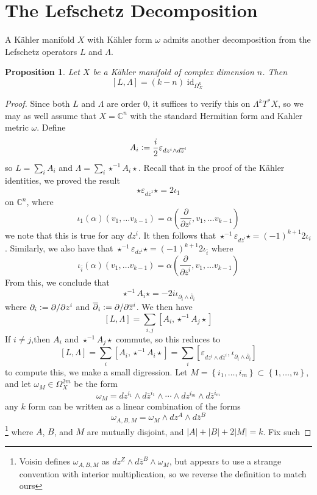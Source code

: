 \documentclass[psamsfonts, 12pt]{amsart}
\newtheorem{prop}[thm]{Proposition}
\theoremstyle{definition}
\theoremstyle{remark}
\newcommand{\C}{\mathbb{C}}
\newcommand{\dbar}{\overline{\partial}}
\newcommand{\zbar}{\overline{z}}
\newcommand{\inv}{^{-1}}
\newcommand{\set}[1]{\left\lbrace #1 \right\rbrace}
\newcommand{\defeq}{\vcentcolon=}
\DeclareMathOperator{\id}{id}
\begin{document}
\section{The Lefschetz Decomposition}
%
A K\"ahler manifold $X$ with K\"ahler form $\omega$ admits another decomposition
from the Lefschetz operators $L$ and $\Lambda$.
%
\begin{prop}
Let $X$ be a K\"ahler manifold of complex dimension $n$. Then
\[
[L,\Lambda] = (k-n)\id_{\Omega^k_X}
\]
\end{prop}
%
\begin{proof}
Since both $L$ and $\Lambda$ are order $0$, it suffices to verify this on
$\Lambda^kT^*X$, so we may as well assume that $X = \C^n$ with the standard Hermitian
form and Kahler metric $\omega$. Define
\[
A_i \defeq \frac{i}{2}\varepsilon_{dz^i\wedge d\zbar^i}
\]
so $L = \sum_i A_i$ and $\Lambda = \sum_i\star\inv A_i\star$. Recall that in the proof
of the K\"ahler identities, we proved the result
\[
\star\varepsilon_{d\zbar^1}\star = 2\iota_1
\]
on $\C^n$, where
\[
\iota_1(\alpha)(v_1,\ldots v_{k-1})
= \alpha\left(\frac{\partial}{\partial z^i}, v_1, \ldots v_{k-1} \right)
\]
we note that this is true for any $dz^i$. It then follows that
$\star\inv\varepsilon_{d\zbar^i}\star = (-1)^{k+1}2\iota_i$. Similarly, we also have
that $\star\inv\varepsilon_{dz^i}\star = (-1)^{k+1}2\iota_{\bar{i}}$ where
\[
\iota_{\bar{i}}(\alpha)(v_1,\ldots v_{k-1})
= \alpha\left(\frac{\partial}{\partial \zbar^i}, v_1, \ldots v_{k-1} \right)
\]
From this, we conclude that
\[
\star\inv A_i\star = -2i\iota_{\partial_i \wedge \dbar_i}
\]
where $\partial_i \defeq \partial/\partial z^i$ and
$\dbar_i \defeq \partial/\partial\zbar^i$. We then have
\[
[L,\Lambda] = \sum_{i,j} [A_i,\star\inv A_j\star]
\]
If $i \neq j$,then $A_i$ and $\star\inv A_j\star$ commute, so this reduces to
\[
[L,\Lambda]= \sum_i [A_i, \star\inv A_i\star] =
\sum_i [\varepsilon_{dz^i\wedge d\zbar^i}, \iota_{\partial_i \wedge \dbar_i}]
\]
to compute this, we make a small digression. Let
$M = \set{i_1,\ldots, i_m} \subset \set{1,\ldots, n}$,
and let $\omega_M \in \Omega^{2m}_X$ be the form
\[
\omega_M = dz^{i_1}\wedge d\zbar^{i_1} \wedge\cdots\wedge dz^{i_m}\wedge d\zbar^{i_m}
\]
any $k$ form can be written as a linear combination of the forms
\[
\omega_{A,B,M} = \omega_M \wedge dz^A \wedge d\zbar^B
\]
\footnote{Voisin defines $\omega_{A,B,M}$ as $dz^Z \wedge d\zbar^B \wedge \omega_M$,
but appears to use a strange convention with interior multiplication, so we reverse
the definition to match ours}
where $A$, $B$, and $M$ are mutually disjoint, and $|A| + |B| + 2|M| = k$. Fix such

\end{proof}
\end{document}
